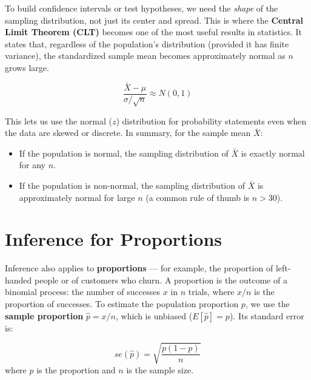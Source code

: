 \documentclass[
  11pt,
  letterpaper,
  DIV=11,
  numbers=noendperiod,
  oneside,
  open=any]{scrreprt}
\providecommand{\tightlist}{%
  \setlength{\itemsep}{0pt}\setlength{\parskip}{0pt}}\usepackage{longtable,booktabs,array}
\begin{document}
To build confidence intervals or test hypotheses, we need the
\emph{shape} of the sampling distribution, not just its center and
spread. This is where the \textbf{Central Limit Theorem (CLT)} becomes
one of the most useful results in statistics. It states that, regardless
of the population's distribution (provided it has finite variance), the
standardized sample mean becomes approximately normal as \(n\) grows
large.

\begin{bsformula}

\[\frac{\bar{X} - \mu}{\sigma / \sqrt{n}} \approx N(0, 1)\]

\end{bsformula}

This lets us use the normal (\(z\)) distribution for probability
statements even when the data are skewed or discrete. In summary, for
the sample mean \(\bar{X}\):

\begin{itemize}
\tightlist
\item
  If the population is normal, the sampling distribution of \(\bar{X}\)
  is exactly normal for any \(n\).
\item
  If the population is non-normal, the sampling distribution of
  \(\bar{X}\) is approximately normal for large \(n\) (a common rule of
  thumb is \(n > 30\)).
\end{itemize}

\section{Inference for Proportions}\label{inference-for-proportions}

Inference also applies to \textbf{proportions} --- for example, the
proportion of left-handed people or of customers who churn. A proportion
is the outcome of a binomial process: the number of successes \(x\) in
\(n\) trials, where \(x/n\) is the proportion of successes. To estimate
the population proportion \(p\), we use the \textbf{sample proportion}
\(\hat{p} = x/n\), which is unbiased (\(E[\hat{p}] = p\)). Its standard
error is:

\begin{bsformula}

\[se(\hat{p}) = \sqrt{\frac{p(1-p)}{n}}\] where \(p\) is the proportion
and \(n\) is the sample size.

\end{bsformula}
\end{document}
